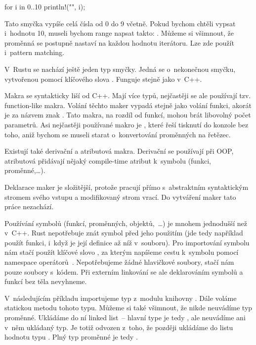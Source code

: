 \documentclass[main.tex]{subfiles}
\begin{document}
\obrazek
\begin{rustcode}
    for i in 0..10 {
        println!("{}", i);
    }
\end{rustcode}

Tato smyčka vypíše celá čísla od 0 do 9 včetně. Pokud bychom chtěli vypsat i~hodnotu 10,
museli bychom range napsat takto: . Můžeme si všimnout, že proměnná
 se postupně nastaví na každou hodnotu iterátoru. Lze zde použít i~pattern
matching. \cite[sekce\,8.2.13]{reference}


V~Rustu se nachází ještě jeden typ smyčky. Jedná se o~nekonečnou smyčku, vytvořenou
pomocí klíčového slova . Funguje stejně jako  v~C++.


Makra se syntakticky liší od C++. Mají více typů, nejčastěji se ale používají tzv.
function-like makra. Volání těchto maker vypadá stejně jako volání funkci, akorát je za
názvem znak \irust{!}. Tato makra, na rozdíl od funkcí, mohou brát libovolný počet
parametrů. Asi nejčastěji používané makro je , které řeší tisknutí do
konzole bez toho, aniž bychom se museli starat o~konvertování proměnných na řetězec.

Existují také derivační a atributová makra. Derivační se používají při OOP, atributová
přidávají nějaký compile-time atribut k~symbolu (funkci, proměnné,\dots).
\cite[sekce\,19.5]{thebook}

Deklarace maker je složitější, protože pracují přímo s~abstraktním syntaktickým stromem
svého vstupu a modifikovaný strom vrací. Do vytváření maker tato práce nezachází.


Používání symbolů (funkcí, proměnných, objektů,~\dots) je mnohem jednodušší než v~C++.
Rust nepotřebuje znát symbol před jeho použitím (jde tedy například použít funkci, i~když
je její definice až níž v~souboru). Pro importování symbolu nám stačí použít klíčové slovo
, za kterým napíšeme cestu k~symbolu pomocí namespace operátorů~\irust{::}.
Nepotřebujeme žádné hlavičkové soubory, stačí nám pouze soubory s~kódem.
\cite[keyword.use]{ruststd} Při externím linkování se ale deklarováním symbolů a funkcí
bez těla nevyhneme. \cite[keyword.extern]{ruststd}

V~následujícím příkladu importujeme typ  z~modulu 
knihovny . Dále voláme statickou metodu  tohoto typu. Můžeme si také
všimnout, že nikde neuvádíme typ proměnné. Ukládáme do ní  linked list~-- hlavní
type je tedy , ale neuvádíme ani v~něm ukládaný typ. Je totiž odvozen
z~toho, že později ukládáme do listu hodnotu typu . Plný typ proměnné
 je tedy .
\end{document}
